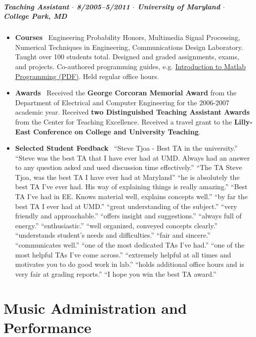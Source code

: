 \documentclass[10pt,letterpaper]{article}
\begin{document}
\subparagraph{Teaching Assistant $\cdot$ \textnormal{8/2005--5/2011} $\cdot$ University of Maryland $\cdot$ \textnormal{College Park, MD}}
\begin{itemize}
    \item \textbf{Courses} \ Engineering Probability Honors, Multimedia Signal Processing, Numerical Techniques in Engineering, Communications Design Laboratory. Taught over 100 students total. Designed and graded assignments, exams, and projects. Co-authored programming guides, e.g. \href{http://up.stevetjoa.com/408_0608_matlab_intro.pdf}{Introduction to Matlab Programming (PDF)}. Held regular office hours. 
    \item \textbf{Awards} \ Received the \textbf{George Corcoran Memorial Award} from the Department of Electrical and Computer Engineering for the 2006-2007 academic year.  Received \textbf{two Distinguished Teaching Assistant Awards} from the Center for Teaching Excellence.  Received a travel grant to the \textbf{Lilly-East Conference on College and University Teaching}.
    \item \textbf{Selected Student Feedback} \ ``Steve Tjoa - Best TA in the university.'' ``Steve was the best TA that I have ever had at UMD. Always had an answer to any question asked and used discussion time effectively.'' ``The TA Steve Tjoa, was the best TA I have ever had at Maryland'' ``he is absolutely the best TA I've ever had. His way of explaining things is really amazing.'' ``Best TA I've had in EE. Knows material well, explains concepts well.'' ``by far the best TA I ever had at UMD.''  ``great understanding of the subject.'' ``very friendly and approachable.'' ``offers insight and suggestions.'' ``always full of energy.''  ``enthusiastic.'' ``well organized, conveyed concepts clearly.'' ``understands student's needs and difficulties.'' ``fair and sincere.'' ``communicates well.'' ``one of the most dedicated TAs I've had.'' ``one of the most helpful TAs I've come across.'' ``extremely helpful at all times and motivates you to do good work in lab.'' ``holds additional office hours and is very fair at grading reports.'' ``I hope you win the best TA award.''
\end{itemize}

\section*{Music Administration and Performance}
\end{document}
